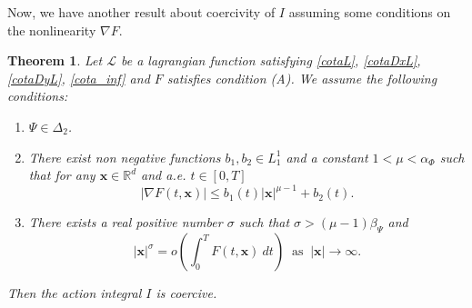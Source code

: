 \documentclass[twoside]{article}
\newtheorem{thm}{Theorem}[section]
\theoremstyle{remark}
\renewcommand{\b}[1]{\boldsymbol{#1}}
\newcommand{\rr}{\mathbb{R}}
\renewcommand{\leq}{\leqslant}
\begin{document}
Now, we have another result about coercivity of $I$ assuming some conditions on the nonlinearity  $\nabla F$. 

\begin{thm}\label{coercitividad-r}
Let  $\mathcal{L}$ be a lagrangian function satisfying \eqref{cotaL}, \eqref{cotaDxL}, \eqref{cotaDyL}, \eqref{cota_inf}  and $F$ satisfies condition (A). We assume the following conditions:
\begin{enumerate}
\item $\Psi\in\Delta_2$.
\item There exist  non negative functions  $b_1,b_2 \in L^1_1$ and a constant $1<\mu<\alpha_{\Phi}$  such that 
for any $\b{x}\in\rr^d$ and a.e. $t\in [0,T]$
\begin{equation}\label{holder_cont-mu}
  \left| \nabla F(t,\b{x}) \right|\leq b_1(t)|\b{x}|^{\mu-1}+b_2(t).
\end{equation}
\item There exists a real positive number $\sigma$ such that $\sigma>(\mu-1)\beta_{\Psi}$ and
\begin{equation}\label{propiedad-coercividad-sigma}
|\b{x}|^{\sigma}=o\left(\int_{0}^{T}F(t,\b{x})\ dt\right)\;\;\mbox{as}\;\;|\b{x}|\to \infty.
\end{equation}
\end{enumerate}
Then  the action integral $I$ is coercive.
\end{thm}
\end{document}
